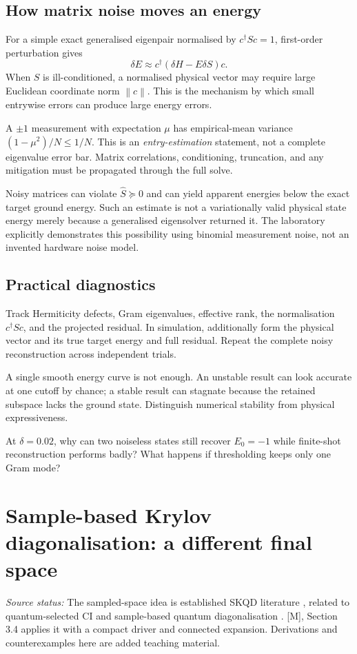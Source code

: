 \documentclass[11pt,a4paper,oneside]{report}
\newcommand{\norm}[1]{\left\lVert #1\right\rVert}
\newcommand{\src}[1]{\par{\small\color{grey}\textit{Source status:} #1}\par}
\newcommand{\checkpoint}[1]{\begin{idea}[Check your understanding]#1\end{idea}}
\begin{document}
\section{How matrix noise moves an energy}
For a simple exact generalised eigenpair normalised by $c^\dagger Sc=1$, first-order perturbation gives
\begin{equation}\label{eq:perturb}
\delta E\approx c^\dagger(\delta H-E\delta S)c.
\end{equation}
When $S$ is ill-conditioned, a normalised physical vector may require large Euclidean coordinate norm $\norm c$. This is the mechanism by which small entrywise errors can produce large energy errors.

A $\pm1$ measurement with expectation $\mu$ has empirical-mean variance $(1-\mu^2)/N\le1/N$. This is an \emph{entry-estimation} statement, not a complete eigenvalue error bar. Matrix correlations, conditioning, truncation, and any mitigation must be propagated through the full solve.

Noisy matrices can violate $\widehat S\succeq0$ and can yield apparent energies below the exact target ground energy. Such an estimate is not a variationally valid physical state energy merely because a generalised eigensolver returned it. The laboratory explicitly demonstrates this possibility using binomial measurement noise, not an invented hardware noise model.

\section{Practical diagnostics}
Track Hermiticity defects, Gram eigenvalues, effective rank, the normalisation $c^\dagger Sc$, and the projected residual. In simulation, additionally form the physical vector and its true target energy and full residual. Repeat the complete noisy reconstruction across independent trials.

A single smooth energy curve is not enough. An unstable result can look accurate at one cutoff by chance; a stable result can stagnate because the retained subspace lacks the ground state. Distinguish numerical stability from physical expressiveness.

\checkpoint{At $\delta=0.02$, why can two noiseless states still recover $E_0=-1$ while finite-shot reconstruction performs badly? What happens if thresholding keeps only one Gram mode?}

\chapter{Sample-based Krylov diagonalisation: a different final space}\label{ch:skqd}
\src{The sampled-space idea is established SKQD literature \cite{yu}, related to quantum-selected CI \cite{kanno} and sample-based quantum diagonalisation \cite{robledo}. [M], Section 3.4 applies it with a compact driver and connected expansion. Derivations and counterexamples here are added teaching material.}
\end{document}
